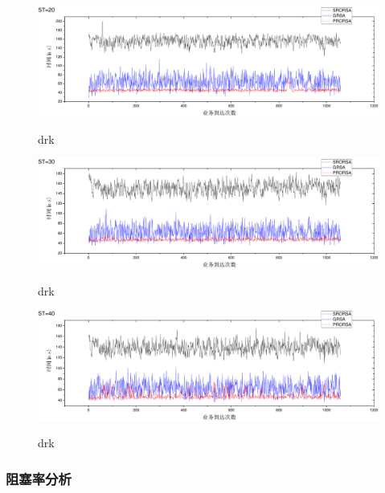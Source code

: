 \begin{figure}
\setlength{\belowcaptionskip}{-0.5cm}
  \begin{center}
    {\includegraphics[width=1 \textwidth]{figures/H20T.pdf}}
    \end{center}
  \caption{{\footnotesize{drk}}}
  \label{drk}
\end{figure}
\begin{figure}
\setlength{\belowcaptionskip}{-0.5cm}
  \begin{center}
    {\includegraphics[width=1 \textwidth]{figures/H30T.pdf}}
    \end{center}
  \caption{{\footnotesize{drk}}}
  \label{drk}
\end{figure}
\begin{figure}
\setlength{\belowcaptionskip}{-0.5cm}
  \begin{center}
    {\includegraphics[width=1 \textwidth]{figures/H40T.pdf}}
    \end{center}
  \caption{{\footnotesize{drk}}}
  \label{drk}
\end{figure}
\subsubsection{阻塞率分析}

